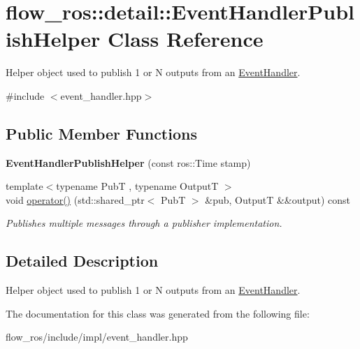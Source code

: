 \hypertarget{classflow__ros_1_1detail_1_1_event_handler_publish_helper}{}\section{flow\+\_\+ros\+:\+:detail\+:\+:Event\+Handler\+Publish\+Helper Class Reference}
\label{classflow__ros_1_1detail_1_1_event_handler_publish_helper}


Helper object used to publish 1 or N outputs from an \hyperlink{classflow__ros_1_1_event_handler}{Event\+Handler}.  




{\ttfamily \#include $<$event\+\_\+handler.\+hpp$>$}

\subsection*{Public Member Functions}
\begin{DoxyCompactItemize}
\item 
\mbox{\label{classflow__ros_1_1detail_1_1_event_handler_publish_helper_a03b4f1bab44068d8de9e7350b0017432}} 
{\bfseries Event\+Handler\+Publish\+Helper} (const ros\+::\+Time stamp)
\item 
\mbox{\label{classflow__ros_1_1detail_1_1_event_handler_publish_helper_a8c5d9219369b2c85e9a3ad231ce57987}} 
{\footnotesize template$<$typename PubT , typename OutputT $>$ }\\void \hyperlink{classflow__ros_1_1detail_1_1_event_handler_publish_helper_a8c5d9219369b2c85e9a3ad231ce57987}{operator()} (std\+::shared\+\_\+ptr$<$ PubT $>$ \&pub, OutputT \&\&output) const
\begin{DoxyCompactList}\small\item\em Publishes multiple messages through a publisher implementation. \end{DoxyCompactList}\end{DoxyCompactItemize}


\subsection{Detailed Description}
Helper object used to publish 1 or N outputs from an \hyperlink{classflow__ros_1_1_event_handler}{Event\+Handler}. 

The documentation for this class was generated from the following file\+:\begin{DoxyCompactItemize}
\item 
flow\+\_\+ros/include/impl/event\+\_\+handler.\+hpp\end{DoxyCompactItemize}
